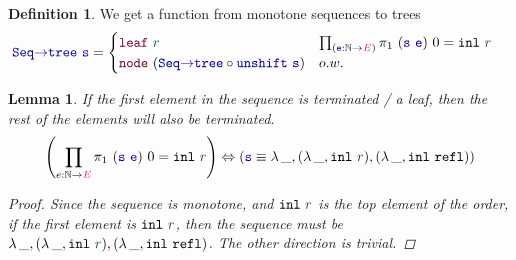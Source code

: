 \documentclass[twoside,11pt,openright]{report}
\theoremstyle{plain} %
\newtheorem{lem}[thm]{Lemma}
\theoremstyle{definition}
\newtheorem{defn}[thm]{Definition}%
\theoremstyle{remark}
\newcommand*{\term}[1]{\textcolor{green!30!black}{#1}} %
\newcommand*{\type}[1]{\textcolor{magenta!90!black}{#1}}
\newcommand*{\function}[1]{\textcolor{blue!60!black}{\ensuremath{\mathtt{#1}}}}
\newcommand*{\constructor}[1]{\textcolor{purple!60!black}{\ensuremath{\mathtt{#1}}}}
\begin{document}
\begin{defn}
  We get a function from monotone sequences to trees
  \begin{equation}
    \begin{aligned}
      &\function{Seq{\rightarrow}tree}~\function{s} = \begin{cases} \constructor{leaf}~\term{r} & \prod_{(\function{e} : \mathbb{N} \rightarrow \type{E})} \pi_1~(\function{s}~\function{e})~0 = \mathtt{inl}~\term{r} \\ \constructor{node}~(\function{Seq{\rightarrow}tree} \circ \function{unshift}~\function{s}) & o.w.  \end{cases}
    \end{aligned}
  \end{equation}
\end{defn}
\begin{lem}
  \label{lem:seq-first-is-leaf}
  If the first element in the sequence is terminated / a leaf, then the rest of the elements will also be terminated.
  \begin{equation}
    \left(\prod_{e : \mathbb{N} \rightarrow \type{E}} \pi_1~(\function{s}~\function{e})~0 = \mathtt{inl}~\term{r}\right) \Leftrightarrow \left(\function{s} \equiv \lambda\,\_,(\lambda\,\_,\mathtt{inl}~\term{r}),(\lambda\,\_,\mathtt{inl}~\mathtt{refl})\right)
  \end{equation}
  \begin{proof}
    Since the sequence is monotone, and \(\mathtt{inl}~\term{r}\) is the top element of the order, if the first element is \(\mathtt{inl}~\term{r}\), then the sequence must be \(\lambda\,\_,(\lambda\,\_,\mathtt{inl}~\term{r}),(\lambda\,\_,\mathtt{inl}~\mathtt{refl})\). The other direction is trivial.
  \end{proof}
\end{lem}
\end{document}
